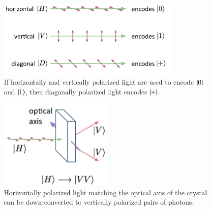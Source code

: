 
\begin{figure}[H]
    \centering
    \includegraphics[width=0.8\textwidth]{lesson4/linear_polarization.pdf}
    
        \caption[Horizontally, vertically and diagonally polarized light]{If horizontally and vertically polarized light are used to encode $\left| 0 \right\rangle$ and $\left| 1 \right\rangle$, then diagonally polarized light encodes $\left| + \right\rangle$.}
    
    \label{fig:hvd-light}
\end{figure}

\begin{figure}[H]
    \centering
    \includegraphics[width=0.5\textwidth]{lesson4/horizontal_optical_axis.pdf}
    
        \caption{Horizontally polarized light matching the optical axis of the crystal can be down-converted to vertically polarized pairs of photons.}
    
    \label{fig:horizontal-opt-axis}
\end{figure}

